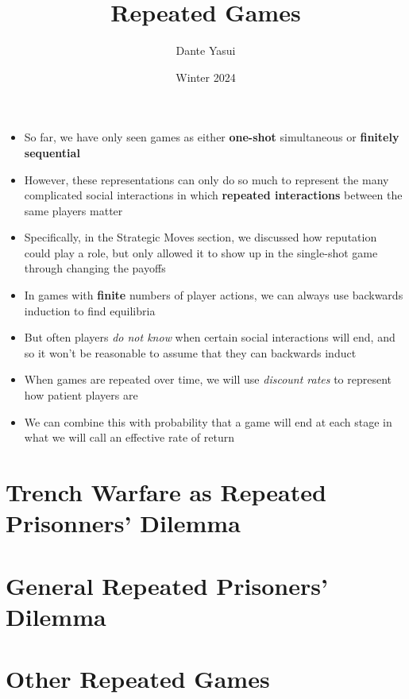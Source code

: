 \documentclass{beamer}
\title{Repeated Games}
\author{Dante Yasui }
\institute{EC327 Game Theory}
\date{Winter 2024}
\theoremstyle{plain}
\begin{document}
\begin{frame}[plain]
    \titlepage
\end{frame}
\addtocounter{framenumber}{-1}




\begin{frame}{}
  \begin{itemize}
    \item So far, we have only seen games as either \textbf{one-shot} simultaneous or \textbf{finitely sequential}
    \item However, these representations can only do so much to represent the many complicated social interactions in which \textbf{repeated interactions} between the same players matter
    \item Specifically, in the Strategic Moves section, we discussed how \alert{reputation} could play a role, but only allowed it to show up in the single-shot game through changing the payoffs 
  \end{itemize} 
\end{frame}

\begin{frame}{}
  \begin{itemize}
    \item In games with \textbf{finite} numbers of player actions, 
    we can always use \alert{backwards induction} to find equilibria
    \item But often players \textit{do not know} when certain social interactions will end, 
    and so it won't be reasonable to assume that they can backwards induct
  \end{itemize} 
\end{frame}

\begin{frame}{}
  \begin{itemize}
    \item When games are repeated over time, we will use \textit{discount rates} to represent how patient players are
    \item We can combine this with probability that a game will end at each stage in what we will call an \alert{effective rate of return}
  \end{itemize} 
\end{frame}

\section*{Trench Warfare as Repeated Prisonners' Dilemma}


\section*{General Repeated Prisoners' Dilemma}


\section*{Other Repeated Games}

\end{document}
